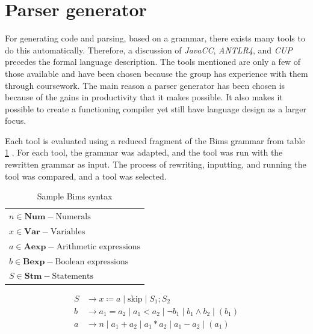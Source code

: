 \section{Parser generator}\label{sec:parsergenerator}
For generating code and parsing, based on a grammar, there exists many tools to do this automatically.
Therefore, a discussion of \textit{JavaCC}, \textit{ANTLR4}, and \textit{CUP} precedes the formal language description. The tools mentioned are only a few of those available and have been chosen because the group has experience with them through coursework.  The main reason a parser generator has been chosen is because of the gains in productivity that it makes possible. It also makes it possible to create a functioning compiler yet still have language design as a larger focus.


Each tool is evaluated using a reduced fragment of the Bims grammar from table \ref{tab:bimsgrammar} \cite{Huttel2010}. For each tool, the grammar was adapted, and the tool was run with the rewritten grammar as input. The process of rewriting, inputting, and running the tool was compared, and a tool was selected.


\begin{table}[htb!]
    \centering
    \begin{tabular}{l}
    $n \in \textbf{Num} - \text{Numerals}$\\
    $x \in \textbf{Var} - \text{Variables}$\\
    $a \in \textbf{Aexp} - \text{Arithmetic expressions}$\\
    $b \in \textbf{Bexp} - \text{Boolean expressions}$\\
    $S \in \textbf{Stm} - \text{Statements}$\\
    \end{tabular}
    \begin{align*}
    S & \rightarrow  x \coloneqq a \mid \text{skip} \mid S_1;S_2\\
    b & \rightarrow a_1 = a_2 \mid a_1 < a_2 \mid \neg b_1 \mid b_1 \land b_2 \mid (b_1)\\
    a & \rightarrow n \mid a_1 + a_2 \mid a_1 * a_2 \mid a_1 - a_2 \mid (a_1)
    \end{align*}
    \caption{Sample Bims syntax \cite{Huttel2010}}
    \label{tab:bimsgrammar}
\end{table}


